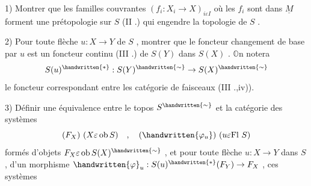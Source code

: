 1) Montrer que les familles couvrantes \((f_i:X_i\to X)_{i\varepsilon I}\) où les \(f_i\) sont dans \(\underline{M}\) forment une prétopologie sur \(S\) (II .) qui engendre la topologie de \(S\) .

2) Pour toute flèche \(u:X\to Y\) de \(S\) , montrer que le foncteur changement de base par \(u\) est un foncteur continu (III .) de \(S(Y)\) dans \(S(X)\) . \(\mathbb{O}\)n notera
\[
S(u)^{\handwritten{*}}:S(Y)^{\handwritten{\sim}}\to S(X)^{\handwritten{\sim}}
\]
le foncteur correspondant entre les catégorie de faisceaux (III .,iv)).

3) Définir une équivalence entre le topos \(S^{\handwritten{\sim}}\) et la catégorie des systèmes
\[
(F_X)\ (X\varepsilon\operatorname{ob}S)\quad,\quad(\handwritten{\varphi_u})\ (u\varepsilon\mathrm{Fl}\ S)
\]
formés d'objets \(F_X\varepsilon\operatorname{ob}S(X)^{\handwritten{\sim}}\) , et pour toute flèche \(u:X\to Y\) dans \(S\) , d'un morphisme \(\handwritten{\varphi}_u:S(u)^{\handwritten{*}}(F_Y)\to F_X\) , ces systèmes
